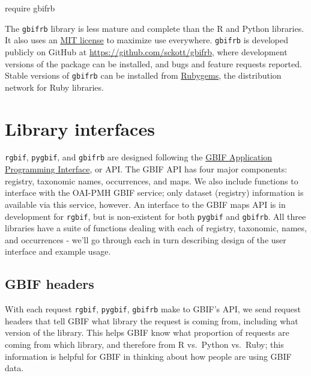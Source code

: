 \documentclass[3p]{elsarticle} %
\newenvironment{Shaded}{\begin{snugshade}}{\end{snugshade}}
\newcommand{\NormalTok}[1]{#1}
\newcommand{\StringTok}[1]{\textcolor[rgb]{0.31,0.60,0.02}{#1}}
\begin{document}
\begin{Shaded}
\begin{Highlighting}[]
\NormalTok{require }\StringTok{\textquotesingle{}gbifrb\textquotesingle{}}
\end{Highlighting}
\end{Shaded}

The \texttt{gbifrb} library is less mature and complete than the R and
Python libraries. It also uses an
\href{https://choosealicense.com/licenses/mit/}{MIT license} to maximize
use everywhere. \texttt{gbifrb} is developed publicly on GitHub at
\url{https://github.com/sckott/gbifrb}, where development versions of
the package can be installed, and bugs and feature requests reported.
Stable versions of \texttt{gbifrb} can be installed from
\href{https://rubygems.org/gems/gbifrb}{Rubygems}, the distribution
network for Ruby libraries.

\hypertarget{library-interfaces}{%
\section{Library interfaces}\label{library-interfaces}}

\texttt{rgbif}, \texttt{pygbif}, and \texttt{gbifrb} are designed
following the \href{https://www.gbif.org/developer/summary}{GBIF
Application Programming Interface}, or API. The GBIF API has four major
components: registry, taxonomic names, occurrences, and maps. We also
include functions to interface with the OAI-PMH GBIF service; only
dataset (registry) information is available via this service, however.
An interface to the GBIF maps API is in development for \texttt{rgbif},
but is non-existent for both \texttt{pygbif} and \texttt{gbifrb}. All
three libraries have a suite of functions dealing with each of registry,
taxonomic, names, and occurrences - we'll go through each in turn
describing design of the user interface and example usage.

\hypertarget{gbif-headers}{%
\subsection{GBIF headers}\label{gbif-headers}}

With each request \texttt{rgbif}, \texttt{pygbif}, \texttt{gbifrb} make
to GBIF's API, we send request headers that tell GBIF what library the
request is coming from, including what version of the library. This
helps GBIF know what proportion of requests are coming from which
library, and therefore from R vs.~Python vs.~Ruby; this information is
helpful for GBIF in thinking about how people are using GBIF data.
\end{document}
